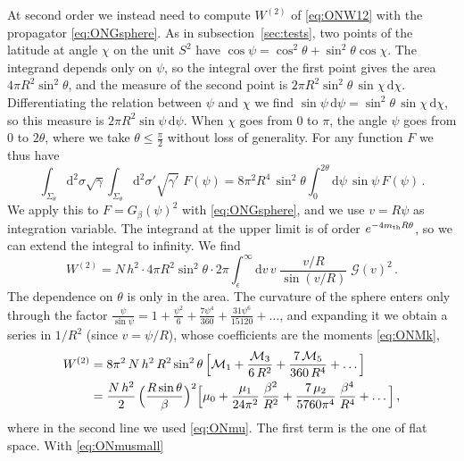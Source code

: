 \documentclass[a4paper,11pt]{article}
\newcommand{\dd}{\mathrm{d}}
\begin{document}
At second order we instead need to compute $W^{(2)}$ of \eqref{eq:ONW12} with the propagator \eqref{eq:ONGsphere}. As in subsection~\ref{sec:tests}, two points of the latitude at angle $\chi$ on the unit $S^2$ have $\cos\psi=\cos^2\theta+\sin^2\theta\cos\chi$. The integrand depends only on $\psi$, so the integral over the first point gives the area $4\pi R^2\sin^2\theta$, and the measure of the second point is $2\pi R^2\sin^2\theta\,\sin\chi\,\dd\chi$. Differentiating the relation between $\psi$ and $\chi$ we find $\sin\psi\,\dd\psi=\sin^2\theta\,\sin\chi\,\dd\chi$, so this measure is $2\pi R^2\sin\psi\,\dd\psi$. When $\chi$ goes from $0$ to $\pi$, the angle $\psi$ goes from $0$ to $2\theta$, where we take $\theta\le\tfrac\pi2$ without loss of generality. For any function $F$ we thus have
\begin{equation}\label{eq:ONmeasure}
	\int_{\Sigma_\theta}\!\dd^2\sigma\sqrt\gamma\int_{\Sigma_\theta}\!\dd^2\sigma'\sqrt{\gamma'}\;F(\psi)=8\pi^2R^4\,\sin^2\theta\int_0^{2\theta}\dd\psi\,\sin\psi\,F(\psi)\, .
\end{equation}
We apply this to $F=G_\beta(\psi)^2$ with \eqref{eq:ONGsphere}, and we use $v=R\psi$ as integration variable. The integrand at the upper limit is of order $e^{-4m_{\rm th}R\theta}$, so we can extend the integral to infinity. We find
\begin{equation}\label{eq:ONW2int}
	W^{(2)}=N\,h^2\cdot4\pi R^2\sin^2\theta\cdot2\pi\int_\epsilon^\infty\dd v\,v\;\frac{v/R}{\sin(v/R)}\;\mathcal{G}(v)^2\, .
\end{equation}
The dependence on $\theta$ is only in the area. The curvature of the sphere enters only through the factor $\tfrac{\psi}{\sin\psi}=1+\tfrac{\psi^2}{6}+\tfrac{7\psi^4}{360}+\tfrac{31\psi^6}{15120}+\dots$, and expanding it we obtain a series in $1/R^2$ (since $v = \psi/R$), whose coefficients are the moments \eqref{eq:ONMk},
\begin{equation}\label{eq:ONmoments}
	\begin{aligned}
		W^{(2)}&=8\pi^2\,N\,h^2\,R^2\sin^2\theta\,\Bigl[\mathcal{M}_1+\frac{\mathcal{M}_3}{6\,R^2}+\frac{7\,\mathcal{M}_5}{360\,R^4}+\dots\Bigr]\\
		&=\frac{N\,h^2}{2}\,\Bigl(\frac{R\sin\theta}{\beta}\Bigr)^{2}\Bigl[\mu_0+\frac{\mu_1}{24\pi^2}\,\frac{\beta^2}{R^2}+\frac{7\,\mu_2}{5760\pi^4}\,\frac{\beta^4}{R^4}+\dots\Bigr]\, ,
	\end{aligned}
\end{equation}
where in the second line we used \eqref{eq:ONmu}. The first term is the one of flat space. With \eqref{eq:ONmusmall}
\end{document}
